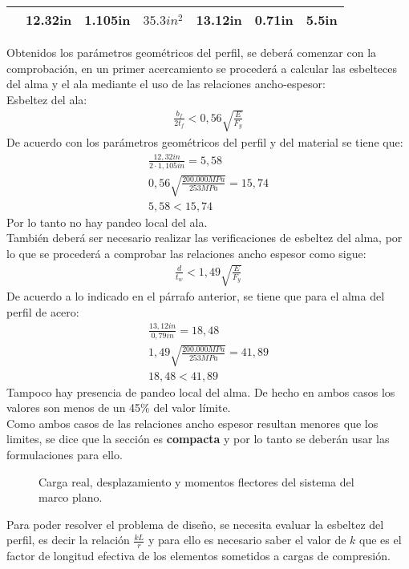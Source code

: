 \begin{example}
\begin{table}[]
\begin{tabular}{ccccccc}
                         & 12.32in & 1.105in & $35.3in^2$ & 13.12in & 0.71in & 5.5in \\ \hline
\end{tabular}
\end{table}
Obtenidos los parámetros geométricos del perfil, se deberá comenzar con la comprobación, en un primer acercamiento se procederá a calcular las esbelteces del alma y el ala mediante el uso de las relaciones ancho-espesor:\\
Esbeltez del ala:\\
\begin{align*}
\frac{b_{f}}{2t_f}<0,56\sqrt{\frac{E}{F_y}}
\end{align*}
De acuerdo con los parámetros geométricos del perfil y del material se tiene que:
\begin{align*}
    \frac{12,32in}{2\cdot 1,105in}=5,58\\
    0,56\sqrt{\frac{200.000MPa}{253MPa}}=15,74\\
    5,58<15,74
\end{align*}
Por lo tanto no hay pandeo local del ala.\\
También deberá ser necesario realizar las verificaciones de esbeltez del alma, por lo que se procederá a comprobar las relaciones ancho espesor como sigue:
\begin{align*}
    \frac{d}{t_w}<1,49\sqrt{\frac{E}{F_y}}
\end{align*}
De acuerdo a lo indicado en el párrafo anterior, se tiene que para el alma del perfil de acero:
\begin{gather*}
    \frac{13,12in}{0,79in}=18,48\\
    1,49\sqrt{\frac{200.000MPa}{253MPa}}=41,89\\
    18,48<41,89
\end{gather*}
Tampoco hay presencia de pandeo local del alma. De hecho en ambos casos los valores son menos de un 45\% del valor límite.\\
Como ambos casos de las relaciones ancho espesor resultan menores que los limites, se dice que la sección es \textbf{compacta} y por lo tanto se deberán usar las formulaciones para ello.\\
\begin{figure}[h]
    \centering
    
    \caption{Carga real, desplazamiento y momentos flectores del sistema del marco plano.}
    \label{fig:marco2}
\end{figure}
Para poder resolver el problema de diseño, se necesita evaluar la esbeltez del perfil, es decir la relación $\frac{kL}{r}$ y para ello es necesario saber el valor de $k$ que es el factor de longitud efectiva de los elementos sometidos a cargas de compresión.\\

\end{example}
